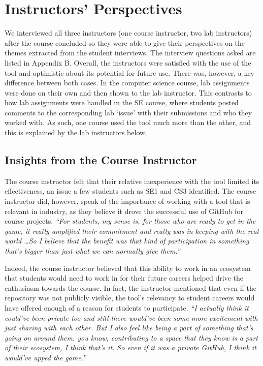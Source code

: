 \section{Instructors' Perspectives}
We interviewed all three instructors (one course instructor, two lab instructors) after the course concluded so they were able to give their perspectives on the themes extracted from the student interviews. The interview questions asked are listed in Appendix B. Overall, the instructors were satisfied with the use of the tool and optimistic about its potential for future use. There was, however, a key difference between both cases. In the computer science course, lab assignments were done on their own and then shown to the lab instructor. This contrasts to how lab assignments were handled in the SE course, where students posted comments to the corresponding lab `issue' with their submissions and who they worked with. As such, one course used the tool much more than the other, and this is explained by the lab instructors below.

\subsection{Insights from the Course Instructor}
The course instructor felt that their relative inexperience with the tool limited its effectiveness, an issue a few students such as SE1 and CS3 identified. The course instructor did, however, speak of the importance of working with a tool that is relevant in industry, as they believe it drove the successful use of GitHub for course projects. \textit{``For students, my sense is, for those who are ready to get in the game, it really amplified their commitment and really was in keeping with the real world \ldots So I believe that the benefit was that kind of participation in something that's bigger than just what we can normally give them.''}


Indeed, the course instructor believed that this ability to work in an ecosystem that students would need to work in for their future careers helped drive the enthusiasm towards the course. In fact, the instructor mentioned that even if the repository was not publicly visible, the tool's relevancy to student careers would have offered enough of a reason for students to participate. \textit{``I actually think it could've been private too and still there would've been some more excitement with just sharing with each other. But I also feel like being a part of something that's going on around them, you know, contributing to a space that they know is a part of their ecosystem, I think that's it. So even if it was a private GitHub, I think it would've upped the game.''}

